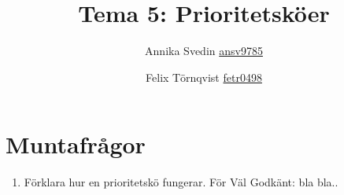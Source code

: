 \documentclass[a5paper,10pt,oneside]{article}
\title{Tema 5: Prioritetsköer}
\author{Annika Svedin \url{ansv9785} \and Felix Törnqvist \url{fetr0498}}
\begin{document}
\maketitle

\section*{Muntafrågor}

\begin{enumerate}
	\item Förklara hur en prioritetskö fungerar. För Väl Godkänt: bla bla..
\end{enumerate}
\end{document}
